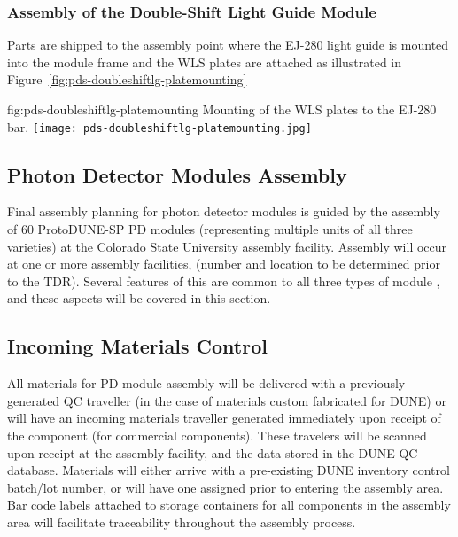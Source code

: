 \subsubsection{Assembly of the Double-Shift Light Guide Module}

Parts are shipped to the assembly point where the EJ-280 light guide is mounted into the module frame and the WLS plates are attached as illustrated in Figure~\ref{fig:pds-doubleshiftlg-platemounting}

\begin{dunefigure}{fig:pds-doubleshiftlg-platemounting}
{Mounting of the WLS plates to the EJ-280 bar.}
  \texttt{[image: pds-doubleshiftlg-platemounting.jpg]}
\end{dunefigure}



\subsection{Photon Detector Modules Assembly}

Final assembly planning for photon detector modules is guided by the assembly of \num{60} ProtoDUNE-SP PD modules (representing multiple units of all three varieties) at the Colorado State University assembly facility.  Assembly will occur at one or more assembly facilities, (number and location to be determined prior to the TDR).  Several features of this are common to all three types of module , and these aspects will be covered in this section.

\subsection{Incoming Materials Control}

All materials for PD module assembly will be delivered with a previously generated QC traveller (in the case of materials custom fabricated for DUNE) or will have an incoming materials traveller generated immediately upon receipt of the component (for commercial components).  These travelers will be scanned upon receipt at the assembly facility, and the data stored in the DUNE QC database.  Materials will either arrive with a pre-existing DUNE inventory control batch/lot number, or will have one assigned prior to entering the assembly area.  Bar code labels attached to storage containers for all components in the assembly area will facilitate traceability throughout the assembly process.


